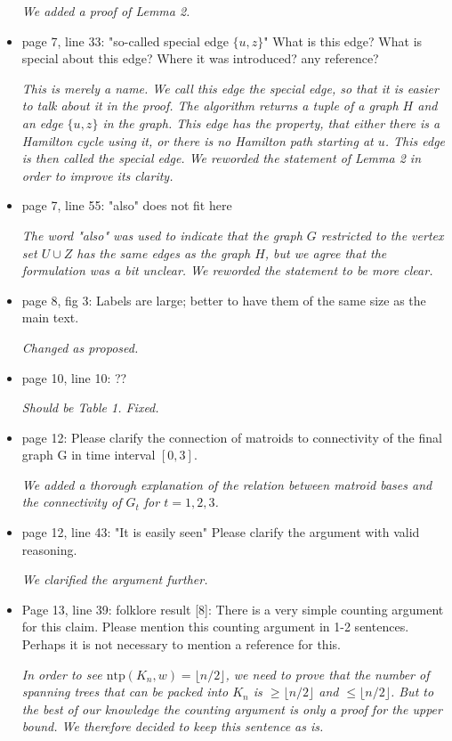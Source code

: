\documentclass[11pt,a4paper]{article}
\begin{document}
\begin{itemize}
\textit{We added a proof of Lemma 2.}

\item page 7, line 33: "so-called special edge $\{u, z\}$" What is this edge? What is special about this edge? Where it was introduced? any reference? 

\textit{This is merely a name. We call this edge the \emph{special edge}, so that it is easier to talk about it in the proof. The algorithm returns a tuple of a graph $H$ and an edge $\{u,z\}$ in the graph. This edge has the property, that either there is a Hamilton cycle using it, or there is no Hamilton path starting at $u$. This edge is then called the special edge. We reworded the statement of Lemma 2 in order to improve its clarity.}

\item page 7, line 55: "also" does not fit here

\textit{The word "also" was used to indicate that the graph $G$ restricted to the vertex set $U \cup Z$ has the same edges as the graph $H$, but we agree that the formulation was a bit unclear. We reworded the statement to be more clear.}

\item page 8, fig 3: Labels are large; better to have them of the same size as the main text.

\textit{Changed as proposed.}

\item page 10, line 10: ??

\textit{Should be Table 1. Fixed.}

\item page 12: Please clarify the connection of matroids to connectivity of the final graph G in time interval $[0,3]$.

\textit{We added a thorough explanation of the relation between matroid bases and the connectivity of $G_t$ for $t=1,2,3$.}

\item page 12, line 43: "It is easily seen" Please clarify the argument with valid reasoning.

\textit{We clarified the argument further.}

\item Page 13, line 39: folklore result [8]: There is a very simple counting argument for this claim. Please mention this counting argument in 1-2 sentences. Perhaps it is not necessary to mention a reference for this.

\textit{In order to see $\text{ntp}(K_n, w) = \lfloor n/2 \rfloor$, we need to prove that the number of spanning trees that can be packed into $K_n$ is $\geq \lfloor n/2 \rfloor$ and $\leq \lfloor n/2 \rfloor$. But to the best of our knowledge the counting argument is only a proof for the upper bound. We therefore decided to keep this sentence as is.}


\end{itemize}
\end{document}
